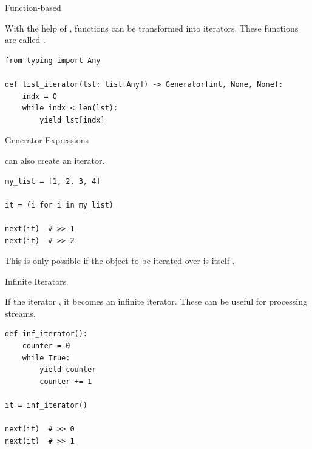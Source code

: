 \documentclass[12pt, aspectratio=169, usepdftitle=false, handout]{beamer}
\newcommand{\pp}[1]{\lpl{#1}}
\begin{document}
\begin{frame}[fragile]{Function-based}

    With the help of \pp{yield}, functions can be transformed into iterators. These functions are called .

    \medskip

    \begin{lstlisting}[language=pytiny]
from typing import Any

def list_iterator(lst: list[Any]) -> Generator[int, None, None]:
    indx = 0
    while indx < len(lst):
        yield lst[indx]

    \end{lstlisting}

\end{frame}


\begin{frame}[fragile]{Generator Expressions}

     can also create an iterator.
    
    \medskip

    \begin{lstlisting}[language=pytiny]
my_list = [1, 2, 3, 4]

it = (i for i in my_list)

next(it)  # >> 1
next(it)  # >> 2
    \end{lstlisting}

This is only possible if the object to be iterated over is itself .

\end{frame}

\begin{frame}[fragile]{Infinite Iterators}

    If the iterator , it becomes an infinite iterator. These can be useful for processing streams.

    \begin{lstlisting}[language=pytiny]
def inf_iterator():
    counter = 0
    while True:
        yield counter
        counter += 1

it = inf_iterator()

next(it)  # >> 0
next(it)  # >> 1
    \end{lstlisting}

\end{frame}
\end{document}
